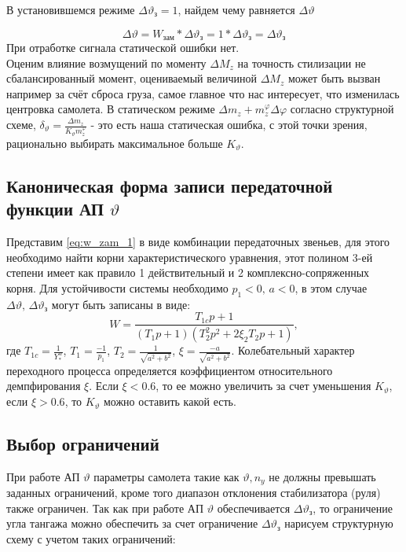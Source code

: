 \documentclass{article}
\begin{document}
В установившемся режиме $\Delta \vartheta_\text{з} = 1$, найдем чему равняется
$\Delta \vartheta$

\[
    \Delta \vartheta = W_\text{зам} * \Delta \vartheta_\text{з} = 1* \Delta
    \vartheta_\text{з} = \Delta \vartheta_\text{з}
\]
При отработке сигнала статической ошибки нет. \\
Оценим влияние возмущений по моменту $\Delta M_z$ на точность стилизации не
сбалансированный момент, оцениваемый величиной $\Delta M_z$ может быть вызван
например за счёт сброса груза, самое главное что нас интересует, что изменилась
центровка самолета. В статическом режиме $\Delta m_z + m_z^\varphi \Delta
\varphi$ согласно структурной схеме, $\delta_\vartheta =\frac{\Delta
m_z}{K_\vartheta m_z^\varphi}$ - это есть наша статическая ошибка, с этой точки
зрения, рационально выбирать максимальное больше $K_\vartheta$.

\subsection{Каноническая форма записи передаточной функции АП
\texorpdfstring{$\vartheta$}{Lg}}
Представим \ref{eq:w_zam_1} в виде комбинации передаточных звеньев, для этого
необходимо найти корни характеристического уравнения, этот полином 3-ей степени
имеет как правило 1 действительный и 2 комплексно-сопряженных корня. Для
устойчивости системы необходимо $p_1 < 0, \, a<0$, в этом случае $\Delta
\vartheta, \, \Delta \vartheta_\text{з}$ могут быть записаны в виде:
\[
    W = \frac{T_{1c} p + 1}{(T_{1}p + 1)(T_2^2 p^2 + 2 \xi_2 T_2 p + 1)},
\]
где $T_{1c} = \frac{1}{Y_*^\alpha}$, $T_1 = \frac{-1}{p_1}$, $T_2 =
\frac{1}{\sqrt{a^2 + b^2}}$, $\xi = \frac{-a}{\sqrt{a^2 + b^2}}$.
Колебательный характер переходного процесса определяется коэффициентом
относительного демпфирования $\xi$. Если $\xi < 0.6$, то ее можно увеличить за
счет уменьшения $K_\vartheta$, если $\xi > 0.6$, то $K_\vartheta$ можно
оставить какой есть.
\subsection{Выбор ограничений}
При работе АП $\vartheta$ параметры самолета такие как $\vartheta, n_y$ не
должны превышать заданных ограничений, кроме того диапазон отклонения
стабилизатора (руля) также ограничен. Так как при работе АП $\vartheta$
обеспечивается $\Delta \vartheta_\text{з}$, то ограничение угла тангажа можно
обеспечить за счет ограничение $\Delta \vartheta_\text{з}$ нарисуем структурную
схему с учетом таких ограничений:
\end{document}
